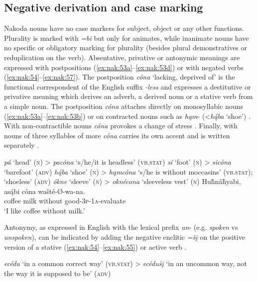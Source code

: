 \documentclass[output=paper,colorlinks,citecolor=brown]{langscibook}
\begin{document}
\subsection{Negative derivation and case marking}\label{sec:nak:3.3}

Nakoda nouns have no case markers for subject, object or any other functions. Plurality is marked with \textit{=bi} but only for animates, while inanimate nouns have no specific or obligatory marking for plurality (besides plural demonstratives or reduplication on the verb). Absentative, privative or antonymic meanings are expressed with postpositions (\ref{ex:nak:53a}--\ref{ex:nak:53d}) or with negated verbs (\ref{ex:nak:54}--\ref{ex:nak:57}).
The postposition \textit{cóna} ‘lacking, deprived of’ is the functional correspondent of the English suffix \textit{-less} and expresses a destitutive or privative meaning which derives an adverb, a derived noun or a stative verb from a simple noun. The postposition \textit{cóna} attaches directly on monosyllabic nouns (\ref{ex:nak:53a}--\ref{ex:nak:53b}) or on contracted nouns such as \textit{hąm}- (<\textit{h\'{ą}ba} ‘shoe’) . With non-contractible nouns \textit{cóna} provokes a change of stress . Finally, with nouns of three syllables of more \textit{cóna} carries its own accent and is written separately .


\ea\label{ex:nak:53}
    \ea\label{ex:nak:53a} \textit{pá} ‘head’ (\textsc{n}) > \textit{pacóna} ‘s/he/it is headless’ (\textsc{vb.stat}) 
    \ex\label{ex:nak:53b} \textit{s\'{i}} ‘foot’ (\textsc{n}) > \textit{sicóna} ‘barefoot’ (\textsc{adv})
    \ex\label{ex:nak:53c} \textit{h\'{ą}ba} ‘shoe’ (\textsc{n}) > \textit{hąmcóna} ‘s/he is without moccasins’ (\textsc{vb.stat}); ‘shoeless’ (\textsc{adv})
    \ex\label{ex:nak:53d} \textit{ókne} ‘sleeve’ (\textsc{n}) > \textit{oknécona} ‘sleeveless vest’ (\textsc{n})
    \ex\label{ex:nak:53e}
        \gll Huȟnáȟyabi, as\'{ą}bi cóna wašté-Ø-wa-na. \\
             coffee milk without good-\textsc{3p-1a}-evaluate \\
        \glt ‘I like coffee without milk.’
    \z
\z

Antonymy, as expressed in English with the lexical prefix \textit{un}- (e.g. \textit{spoken} vs \textit{unspoken}), can be indicated by adding the negative enclitic \textit{=šį} on the positive version of a stative (\ref{ex:nak:54}--\ref{ex:nak:55}) or active verb .

\ea\label{ex:nak:54} 
    \textit{ecédu} ‘in a common correct way’ (\textsc{vb.stat}) \newline > \textit{ecédušį} ‘in an uncommon way, not the way it is supposed to be’ (\textsc{adv})
\z 
\end{document}
